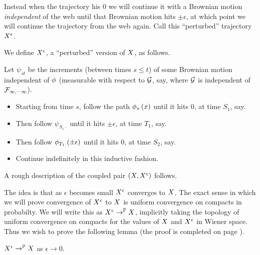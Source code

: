{Instead when the trajectory his $0$ we will continue it with a
Brownian motion \emph{independent} of the web until that Brownian
motion hits $\pm\epsilon$, at which point we will continue the
trajectory from the web again.  Call this ``perturbed'' trajectory
$X^{\epsilon}$.

{
\newcommand{\joinernoargs}{\psi}
\newcommand{\joiner}[2]{\joinernoargs_{{#1}{#2}}}
\begin{definition}
  \label{def:resamplede}
  We define $X^{\epsilon}$, a ``perturbed'' version of $X$, as
  follows.

  Let $\joiner{s}{t}$ be the increments (between times $s \le t$) of
  some Brownian motion independent of $\phi$ (measurable with
  respect to $\mathcal{G}$, say, where $\mathcal{G}$ is independent of
  $\mathcal{F}_{\infty,-\infty}$).

  \begin{itemize}
  \item Starting from time $s$, follow the path $\phi_{{s}{\cdot}}(x)$
    until it hits $0$, at time $S_1$, say.
  \item Then follow $\joiner{S_1}{\cdot}$ until it hits $\pm \epsilon$, at
    time $T_1$, say.
  \item Then follow $\phi_{{T_1}{\cdot}}(\pm \epsilon)$ until it hits $0$, at
    time $S_2$, say.
  \item Continue indefinitely in this inductive fashion.
  \end{itemize}
\end{definition}
}

\begin{obs}
  \label{obs:2d-proc}
  A rough description of the coupled pair $(X, X^{\epsilon})$
  follows.

\end{obs}

The idea is that as $\epsilon$ becomes small $X^{\epsilon}$
converges to $X$.
The exact sense in which we will prove convergence of $X^{\epsilon}$ to
$X$ is uniform convergence on compacts in probabilty.  We will
write this as $X^{\epsilon} \to^{\mathbb{P}} X$, implicitly taking the
topology of uniform convergence on compacts for the values of $X$
and $X^{\epsilon}$ in Wiener space.  Thus we wish to prove the following
lemma (the proof is completed on page
\pageref{proof-of-lem:resamplede-to-sampled}).

\begin{lemma}
  \label{lem:resamplede-to-sampled}
  $X^{\epsilon} \to^{\mathbb{P}} X$ as $\epsilon \to 0$.
\end{lemma}

}
